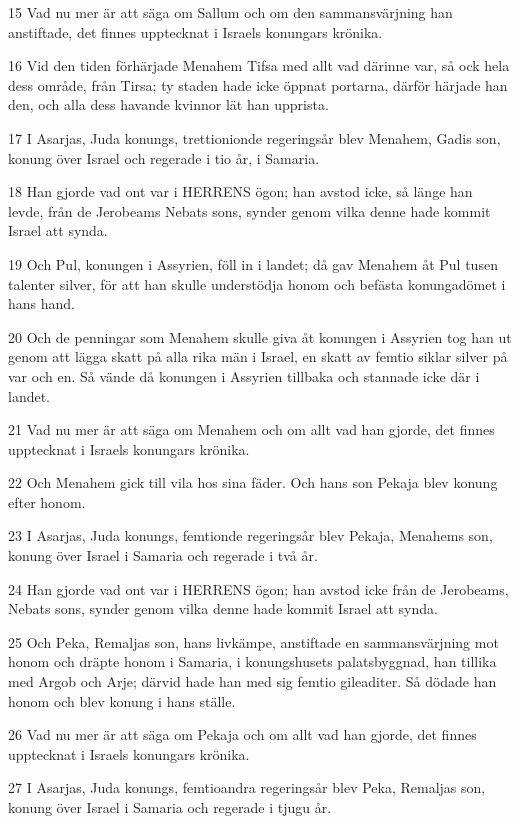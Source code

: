 \par 15 Vad nu mer är att säga om Sallum och om den sammansvärjning han anstiftade, det finnes upptecknat i Israels konungars krönika.
\par 16 Vid den tiden förhärjade Menahem Tifsa med allt vad därinne var, så ock hela dess område, från Tirsa; ty staden hade icke öppnat portarna, därför härjade han den, och alla dess havande kvinnor lät han upprista.
\par 17 I Asarjas, Juda konungs, trettionionde regeringsår blev Menahem, Gadis son, konung över Israel och regerade i tio år, i Samaria.
\par 18 Han gjorde vad ont var i HERRENS ögon; han avstod icke, så länge han levde, från de Jerobeams Nebats sons, synder genom vilka denne hade kommit Israel att synda.
\par 19 Och Pul, konungen i Assyrien, föll in i landet; då gav Menahem åt Pul tusen talenter silver, för att han skulle understödja honom och befästa konungadömet i hans hand.
\par 20 Och de penningar som Menahem skulle giva åt konungen i Assyrien tog han ut genom att lägga skatt på alla rika män i Israel, en skatt av femtio siklar silver på var och en. Så vände då konungen i Assyrien tillbaka och stannade icke där i landet.
\par 21 Vad nu mer är att säga om Menahem och om allt vad han gjorde, det finnes upptecknat i Israels konungars krönika.
\par 22 Och Menahem gick till vila hos sina fäder. Och hans son Pekaja blev konung efter honom.
\par 23 I Asarjas, Juda konungs, femtionde regeringsår blev Pekaja, Menahems son, konung över Israel i Samaria och regerade i två år.
\par 24 Han gjorde vad ont var i HERRENS ögon; han avstod icke från de Jerobeams, Nebats sons, synder genom vilka denne hade kommit Israel att synda.
\par 25 Och Peka, Remaljas son, hans livkämpe, anstiftade en sammansvärjning mot honom och dräpte honom i Samaria, i konungshusets palatsbyggnad, han tillika med Argob och Arje; därvid hade han med sig femtio gileaditer. Så dödade han honom och blev konung i hans ställe.
\par 26 Vad nu mer är att säga om Pekaja och om allt vad han gjorde, det finnes upptecknat i Israels konungars krönika.
\par 27 I Asarjas, Juda konungs, femtioandra regeringsår blev Peka, Remaljas son, konung över Israel i Samaria och regerade i tjugu år.
